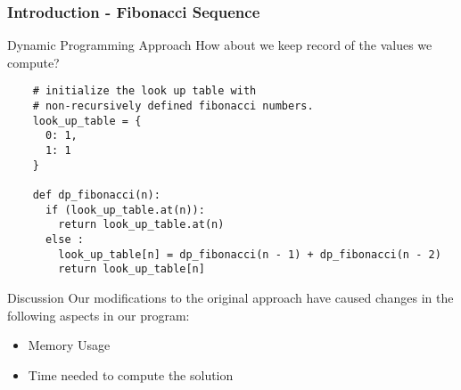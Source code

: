 \begin{frame}[fragile]
  \frametitle{Introduction - Fibonacci Sequence}
  \begin{block}{Dynamic Programming Approach}
    How about we keep record of the values we compute?
  \end{block}
  \begin{lstlisting}
    # initialize the look up table with 
    # non-recursively defined fibonacci numbers.
    look_up_table = {
      0: 1,
      1: 1  
    }

    def dp_fibonacci(n):
      if (look_up_table.at(n)):
        return look_up_table.at(n)
      else :
        look_up_table[n] = dp_fibonacci(n - 1) + dp_fibonacci(n - 2)
        return look_up_table[n]
  \end{lstlisting}
\end{frame}


\begin{frame}
  \begin{block}{Discussion}
    Our modifications to the original approach have
    caused changes in the following aspects in our program:
    \begin{itemize}
      \item Memory Usage
      \item Time needed to compute the solution
    \end{itemize}
  \end{block}
\end{frame}